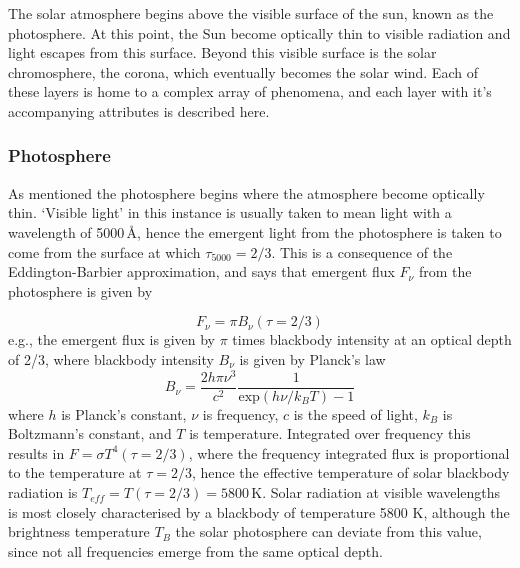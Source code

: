 The solar atmosphere begins above the visible surface of the sun, known as the photosphere. At this point, the Sun become optically thin to visible radiation and light escapes from this surface. Beyond this visible surface is the solar chromosphere, the corona, which eventually becomes the solar wind. Each of these layers is home to a complex array of phenomena, and each layer with it's accompanying attributes is described here.


\subsubsection{Photosphere}\label{sec:121}

As mentioned the photosphere begins where the atmosphere become optically thin. \textquoteleft Visible light' in this instance is usually taken to mean light with a wavelength of 5000\,\AA, hence the emergent light from the photosphere is taken to come from the surface at which $\tau_{5000}=2/3$. This is a consequence of the Eddington-Barbier approximation, and says that emergent flux $F_{\nu}$ from the photosphere is given by

\begin{equation}
F_\nu = \pi B_\nu(\tau=2/3)
\end{equation}
e.g., the emergent flux is given by $\pi$ times blackbody intensity at an optical depth of 2/3, where blackbody intensity $B_\nu$ is given by Planck's law 
\begin{equation}
B_\nu = \frac{2h\pi\nu^3}{c^2}\frac{1}{\mathrm{exp}(h\nu/k_BT)-1}
\end{equation}
where $h$ is Planck's constant, $\nu$ is frequency, $c$ is the speed of light, $k_B$ is Boltzmann's constant, and $T$ is temperature. Integrated over frequency this results in $F = \sigma T^4(\tau=2/3)$, where the frequency integrated flux is proportional to the temperature at $\tau=2/3$, hence the effective temperature of solar blackbody radiation is $T_{eff}=T(\tau=2/3)=5800$\,K. Solar radiation at visible wavelengths is most closely characterised by a blackbody of temperature 5800 K, although the brightness temperature $T_B$ the solar photosphere can deviate from this value, since not all frequencies emerge from the same optical depth.

